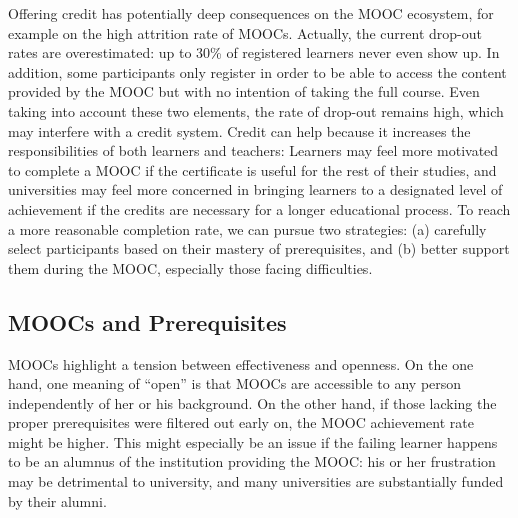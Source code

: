 Offering credit has potentially deep consequences on the MOOC
ecosystem, for example on the high attrition rate of MOOCs. 
Actually, the
current drop-out rates are overestimated: up to 30\% of registered learners never
even show up. In addition, some participants only
register in order to be able to access the content provided by the MOOC
but with no intention of taking the full course. Even taking into account these two elements, 
the rate of drop-out remains high, which may interfere with a
credit system. Credit can help because it increases the responsibilities
of both learners and teachers: Learners may feel more motivated to complete a
MOOC if the certificate is useful for the rest of their
studies, and universities may feel more concerned in bringing learners to
a designated level of achievement if the credits are necessary for a longer educational
process.  To reach a more reasonable completion rate, we can pursue two strategies:
(a)  carefully select participants based on their
mastery of prerequisites, and (b)  better support them during the MOOC,
especially those facing difficulties. 


\subsection{MOOCs and Prerequisites}

MOOCs highlight a tension between effectiveness and openness. 
On the one hand, one meaning of  ``open''  is that MOOCs are accessible to any
person independently of her or his background.  On the other hand,
if those lacking the proper prerequisites were filtered
out early on, the MOOC achievement rate might be higher. This might
especially be
an issue if the failing learner happens to be an alumnus of the institution providing the
MOOC: his or her frustration may be detrimental to
university, and many universities are substantially funded by their alumni. 


